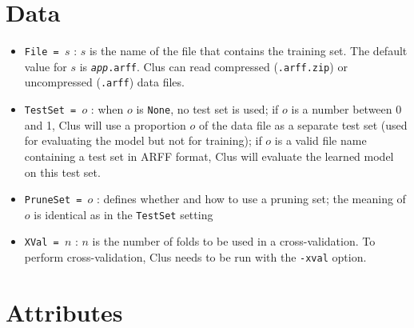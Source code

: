 \documentclass[a4paper]{report}
\begin{document}
\section{Data}

\begin{itemize}
\item {\tt File = $s$} : $s$ is the name of the file that contains the training set.  The default value for $s$ is {\tt {\em app}.arff}.  Clus can read compressed ({\tt .arff.zip}) or uncompressed ({\tt .arff}) data files.
\item {\tt TestSet = $o$} : when $o$ is {\tt None}, no test set is used; if $o$ is a number between 0 and 1, Clus will use a proportion $o$ of the data file as a separate test set (used for evaluating the model but not for training); if $o$ is a valid file name containing a test set in ARFF format, Clus will evaluate the learned model on this test set.
\item {\tt PruneSet = $o$} : defines whether and how to use a pruning set; the meaning of $o$ is identical as in the {\tt TestSet} setting
\item {\tt XVal = $n$} : $n$ is the number of folds to be used in a cross-validation.  To perform cross-validation, Clus needs to be run with the {\tt -xval} option.
\end{itemize}

\section{Attributes}
\end{document}

